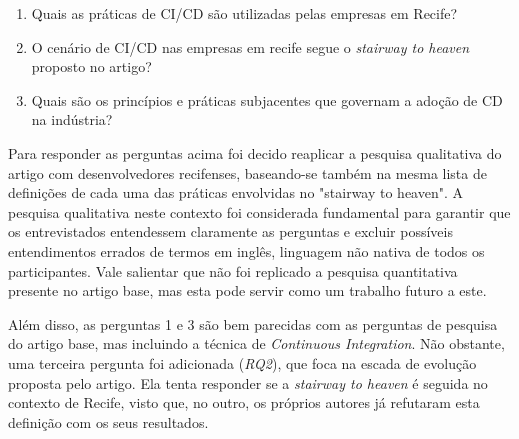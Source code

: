 \begin{enumerate}
\item Quais as práticas de CI/CD são utilizadas pelas empresas em Recife?
\item O cenário de CI/CD nas empresas em recife segue o \emph{stairway to heaven} proposto no artigo?
\item Quais são os princípios e práticas subjacentes que governam a adoção de CD na indústria?
\end{enumerate}

Para responder as perguntas acima foi decido reaplicar a pesquisa qualitativa do artigo \cite{empiricalStudy2016} com desenvolvedores recifenses, baseando-se também na mesma lista de definições de cada uma das práticas envolvidas no "stairway to heaven". A pesquisa qualitativa neste contexto foi considerada fundamental para garantir que os entrevistados entendessem claramente as perguntas e excluir possíveis entendimentos errados de termos em inglês, linguagem não nativa de todos os participantes. Vale salientar que não foi replicado a pesquisa quantitativa presente no artigo base, mas esta pode servir como um trabalho futuro a este.

Além disso, as perguntas 1 e 3 são bem parecidas com as perguntas de pesquisa do artigo base, mas incluindo a técnica de \emph{Continuous Integration}. Não obstante, uma terceira pergunta foi adicionada (\emph{RQ2}), que foca na escada de evolução proposta pelo artigo. Ela tenta responder se a \emph{stairway to heaven} é seguida no contexto de Recife, visto que, no outro, os próprios autores já refutaram esta definição com os seus resultados.


